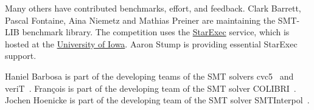 \documentclass[12pt]{article}
\begin{document}
Many others have contributed benchmarks, effort, and feedback.  Clark Barrett,
Pascal Fontaine, Aina Niemetz and Mathias Preiner are maintaining the SMT-LIB
benchmark library.
The competition uses the
\href{https://www.starexec.org/}{StarExec} service, which is hosted at
the \href{http://www.cs.uiowa.edu/}{University of Iowa}.  Aaron Stump
is providing essential StarExec support.

%
Haniel Barbosa is part of the developing teams of the SMT solvers
cvc5~\cite{cvc5} and veriT~\cite{verit}.
%
Fran\c{c}ois is part of the developing team of the SMT solver COLIBRI~\cite{colibri}.
%
Jochen Hoenicke is part of the developing team of the SMT solver
SMTInterpol~\cite{smtinterpol}.


\pagebreak



\end{document}
